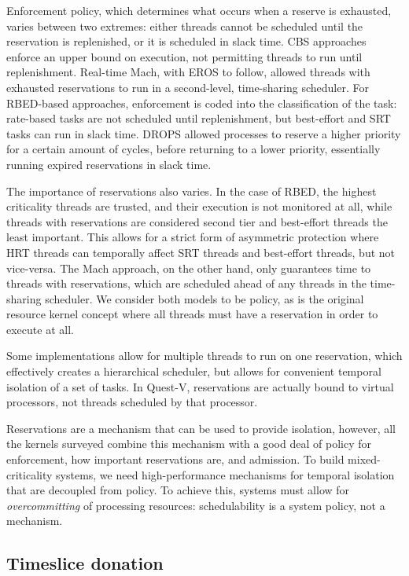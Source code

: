 Enforcement policy, which determines what occurs when a reserve is exhausted,
varies between two extremes: either threads cannot be scheduled until the reservation is
replenished, or it is scheduled in slack time. 
\gls{CBS} approaches enforce an upper bound on execution, not permitting threads to run until 
replenishment. Real-time Mach, with EROS to follow, allowed threads with exhausted reservations to
run in a second-level, time-sharing scheduler. For RBED-based approaches, enforcement is coded into
the classification of the task: rate-based tasks are not scheduled until replenishment, but
best-effort and \gls{SRT} tasks can run in slack time. 
\gls{DROPS} allowed processes to reserve a 
higher priority for a certain amount of cycles, before returning to a lower priority, essentially
running expired reservations in slack time. 

The importance of reservations also varies. In the case of RBED, the highest criticality threads
are trusted, and their execution is not monitored at all, while threads with reservations are
considered second tier and best-effort threads the least important. This allows for a strict form 
of asymmetric protection where \gls{HRT} threads can temporally affect \gls{SRT} threads and
best-effort threads, but not vice-versa. The Mach approach, on the other hand, only guarantees time
to threads with reservations, which are scheduled ahead of any threads in the time-sharing
scheduler. We consider both models to be policy, as is the original resource kernel concept where
all threads must have a reservation in order to execute at all.  

Some implementations allow for multiple threads to run on one reservation, which effectively creates
a hierarchical scheduler, but allows for convenient temporal isolation of a set of tasks. In
Quest-V, reservations are actually bound to virtual processors, not threads scheduled by that
processor. 

\label{p:overcommit}
Reservations are a mechanism that can be used to provide isolation, however, all the kernels
surveyed combine this mechanism with a good deal of policy for enforcement, how important
reservations are, and admission. To build mixed-criticality systems, we
need high-performance mechanisms for temporal isolation that are decoupled from policy. To achieve
this, systems must allow for \emph{overcommitting} of processing resources: schedulability is a system 
policy, not a mechanism. 

\subsection{Timeslice donation}
\label{sec:os-timeslice-donation}

